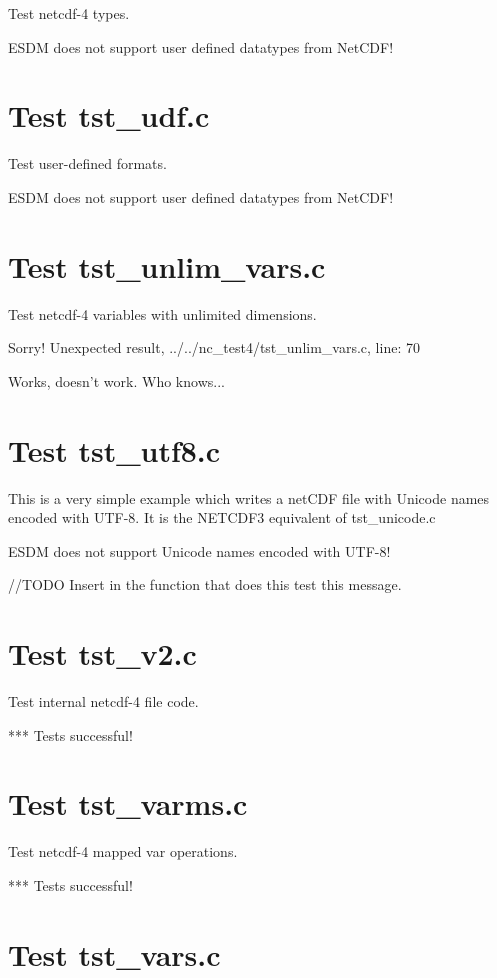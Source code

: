 Test netcdf-4 types.

ESDM does not support user defined datatypes from NetCDF!

\section{Test tst\_udf.c}

Test user-defined formats.

ESDM does not support user defined datatypes from NetCDF!

\section{Test tst\_unlim\_vars.c}

Test netcdf-4 variables with unlimited dimensions.

Sorry! Unexpected result, ../../nc\_test4/tst\_unlim\_vars.c, line: 70

Works, doesn't work. Who knows...

\section{Test tst\_utf8.c}

This is a very simple example which writes a netCDF file with Unicode names encoded with UTF-8. It is the NETCDF3 equivalent of tst\_unicode.c

ESDM does not support Unicode names encoded with UTF-8!

//TODO Insert in the function that does this test this message.

\section{Test tst\_v2.c}

Test internal netcdf-4 file code.

*** Tests successful!

\section{Test tst\_varms.c}

Test netcdf-4 mapped var operations.

*** Tests successful!

\section{Test tst\_vars.c}

